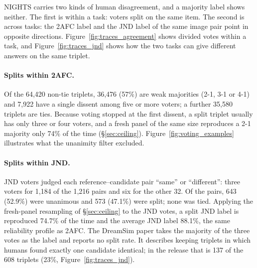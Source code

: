 \clearpage

\vspace{1em}

NIGHTS carries two kinds of human disagreement, and a majority label shows neither. The first is within a task: voters split on the same item. The second is across tasks: the 2AFC label and the JND label of the same image pair point in opposite directions. Figure~\ref{fig:traces_agreement} shows divided votes within a task, and Figure~\ref{fig:traces_jnd} shows how the two tasks can give different answers on the same triplet.

\paragraph{Splits within 2AFC.} Of the 64{,}420 non-tie triplets, 36{,}476 (57\%) are weak majorities (2-1, 3-1 or 4-1) and 7{,}922 have a single dissent among five or more voters; a further 35{,}580 triplets are ties. Because voting stopped at the first dissent, a split triplet usually has only three or four voters, and a fresh panel of the same size reproduces a 2-1 majority only 74\% of the time (\S\ref{sec:ceiling}). Figure~\ref{fig:voting_examples} illustrates what the unanimity filter excluded.

\paragraph{Splits within JND.} JND voters judged each reference--candidate pair ``same'' or ``different'': three voters for 1{,}184 of the 1{,}216 pairs and six for the other 32. Of the pairs, 643 (52.9\%) were unanimous and 573 (47.1\%) were split; none was tied. Applying the fresh-panel resampling of \S\ref{sec:ceiling} to the JND votes, a split JND label is reproduced 74.7\% of the time and the average JND label 88.1\%, the same reliability profile as 2AFC. The DreamSim paper takes the majority of the three votes as the label and reports no split rate. It describes keeping triplets in which humans found exactly one candidate identical; in the release that is 137 of the 608 triplets (23\%, Figure~\ref{fig:traces_jnd}).


